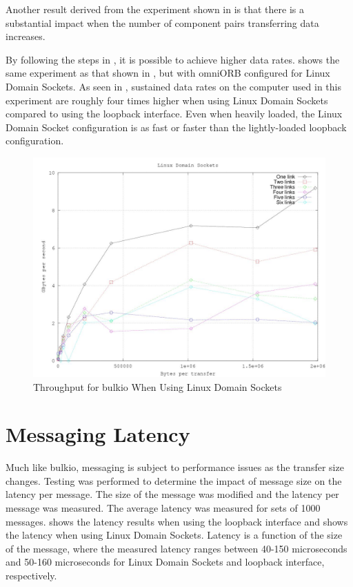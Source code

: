 Another result derived from the experiment shown in  is that there is a substantial impact when the number of component pairs transferring data increases.

By following the steps in , it is possible to achieve higher data rates.  shows the same experiment as that shown in , but with omniORB configured for Linux Domain Sockets. As seen in , sustained data rates on the computer used in this experiment are roughly four times higher when using Linux Domain Sockets compared to using the loopback interface. Even when heavily loaded, the Linux Domain Socket configuration is as fast or faster than the lightly-loaded loopback configuration.

\begin{figure}[H]
  \centering
  \includegraphics[width=120mm]{optimization/linux_domain_sockets.jpg}
  \caption{Throughput for \ac{bulkio} When Using Linux Domain Sockets}
  \label{figure:ldsThroughput}
\end{figure}

\section{Messaging Latency}

Much like \ac{bulkio}, messaging is subject to performance issues as the transfer size changes. Testing was performed to determine the impact of message size on the latency per message. The size of the message was modified and the latency per message was measured. The average latency was measured for sets of 1000 messages.  shows the latency results when using the loopback interface and  shows the latency when using Linux Domain Sockets. Latency is a function of the size of the message, where the measured latency ranges between 40-150 microseconds and 50-160 microseconds for Linux Domain Sockets and loopback interface, respectively.

